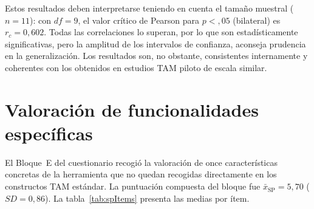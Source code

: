 Estos resultados deben interpretarse teniendo en cuenta el tamaño muestral ($n = 11$): con $df = 9$, el valor crítico de Pearson para $p < {,}05$ (bilateral) es $r_{c} = 0{,}602$. Todas las correlaciones lo superan, por lo que son estadísticamente significativas, pero la amplitud de los intervalos de confianza, aconseja prudencia en la generalización. Los resultados son, no obstante, consistentes internamente y coherentes con los obtenidos en estudios TAM piloto de escala similar.

\section{Valoración de funcionalidades específicas}\label{sec:resultados-sp}

El Bloque~E del cuestionario recogió la valoración de once características concretas de la herramienta que no quedan recogidas directamente en los constructos TAM estándar. La puntuación compuesta del bloque fue $\bar{x}_{\text{SP}} = 5{,}70$ ($SD = 0{,}86$). La tabla~\ref{tab:spItems} presenta las medias por ítem.

